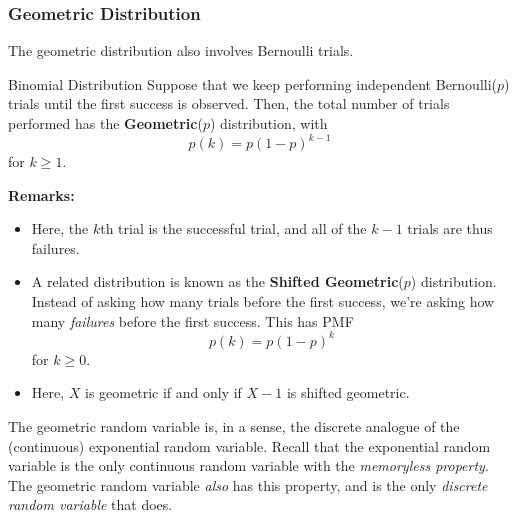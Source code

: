 \documentclass[letterpaper]{article}
\begin{document}
\subsubsection{Geometric Distribution}
The geometric distribution also involves Bernoulli trials. 
\begin{definition}{Binomial Distribution}{}
    Suppose that we keep performing independent Bernoulli($p$) trials until the first success is observed. Then, the total number of trials performed has the \textbf{Geometric}($p$) distribution, with 
    \[p(k) = p(1 - p)^{k - 1}\]
    for $k \geq 1$. 
\end{definition}
\textbf{Remarks:}
\begin{itemize}
    \item Here, the $k$th trial is the successful trial, and all of the $k - 1$ trials are thus failures. 
    \item A related distribution is known as the \textbf{Shifted Geometric}($p$) distribution. Instead of asking how many trials before the first success, we're asking how many \emph{failures} before the first success. This has PMF 
    \[p(k) = p(1 - p)^k\]
    for $k \geq 0$. 
    \item Here, $X$ is geometric if and only if $X - 1$ is shifted geometric.
\end{itemize}
The geometric random variable is, in a sense, the discrete analogue of the (continuous) exponential random variable. Recall that the exponential random variable is the only continuous random variable with the \emph{memoryless property}. The geometric random variable \emph{also} has this property, and is the only \emph{discrete random variable} that does.
\end{document}

